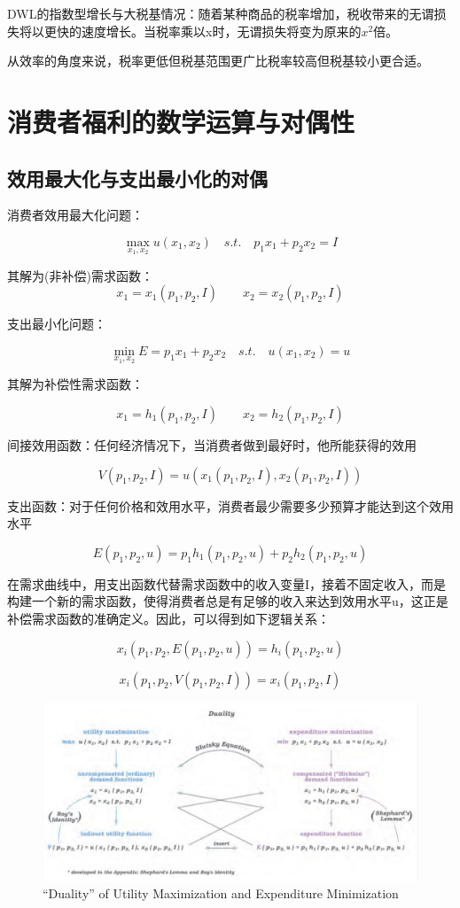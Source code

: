 \documentclass{article}
\begin{document}
DWL的指数型增长与大税基情况：随着某种商品的税率增加，税收带来的无谓损失将以更快的速度增长。当税率乘以x时，无谓损失将变为原来的$ x^2 $倍。

从效率的角度来说，税率更低但税基范围更广比税率较高但税基较小更合适。

\section{消费者福利的数学运算与对偶性}
\subsection{效用最大化与支出最小化的对偶}

消费者效用最大化问题：

\[
\max\limits_{x_1,x_2}u(x_1,x_2)\quad s.t.\quad p_1x_1+p_2x_2=I
\]

其解为(非补偿)需求函数：
\[
x_1=x_1(p_1,p_2,I)\qquad x_2=x_2(p_1,p_2,I)
\]

支出最小化问题：

\[
\min\limits_{x_1,x_2}E=p_1x_1+p_2x_2\quad s.t.\quad u(x_1,x_2)=u
\]

其解为补偿性需求函数：

\[
x_1=h_1(p_1,p_2,I)\qquad x_2=h_2(p_1,p_2,I)
\]

间接效用函数：任何经济情况下，当消费者做到最好时，他所能获得的效用

\[
V(p_1,p_2,I)=u(x_1(p_1,p_2,I),x_2(p_1,p_2,I))
\]

支出函数：对于任何价格和效用水平，消费者最少需要多少预算才能达到这个效用水平

\[
E(p_1,p_2,u)=p_1h_1(p_1,p_2,u)+p_2h_2(p_1,p_2,u)
\]

在需求曲线中，用支出函数代替需求函数中的收入变量I，接着不固定收入，而是构建一个新的需求函数，使得消费者总是有足够的收入来达到效用水平u，这正是补偿需求函数的准确定义。因此，可以得到如下逻辑关系：

\[
x_i(p_1,p_2,E(p_1,p_2,u))=h_i(p_1,p_2,u)
\]

\[
x_i(p_1,p_2,V(p_1,p_2,I))=x_i(p_1,p_2,I)
\]

\begin{figure}[H] %
	\centering %
	\includegraphics[width=1\textwidth]{DWL_3} %
	\caption{“Duality” of Utility Maximization and Expenditure Minimization} %
	\label{Fig.main5} %
\end{figure}
\end{document}
